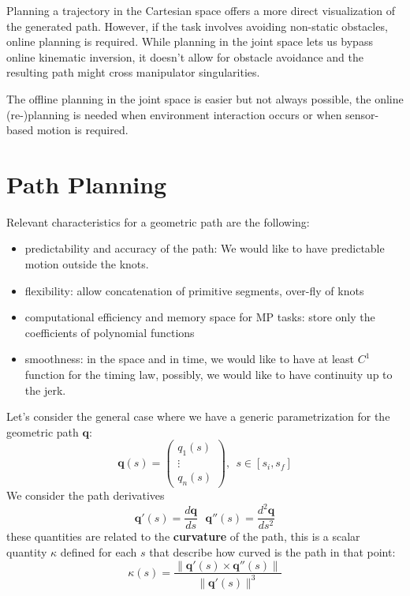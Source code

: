 \documentclass[10pt, letterpaper]{report}
\begin{document}
Planning a trajectory in the Cartesian space offers a more direct visualization of the generated path. However, if the task involves avoiding non-static obstacles, online planning is required. While planning in the joint space lets us bypass online kinematic inversion, it doesn't allow for obstacle avoidance and the resulting path might cross manipulator singularities.

The offline planning in the joint space is easier but not always possible, the online (re-)planning is needed when environment interaction
occurs or when sensor-based motion is required.
\section{Path Planning}
Relevant characteristics for a geometric path are the following:\begin{itemize}
    \item predictability and accuracy of the path: We would like to have predictable motion outside the knots.
    \item flexibility: allow concatenation of primitive segments, over-fly of knots
    \item computational efficiency and memory space for MP tasks: store only the coefficients of polynomial functions
    \item smoothness: in the space and in time, we would like to have at least $C^1$ function for the timing law, possibly, we would like to have continuity up to the jerk.
\end{itemize}
Let's consider the general case where we have a generic parametrization for the geometric path $\mathbf q$:\begin{equation}
    \mathbf q(s)=\begin{pmatrix}
        q_1(s)\\ \vdots \\ q_n(s)
    \end{pmatrix}, \ \ s\in [s_i,s_f]
\end{equation}
We consider the path derivatives\begin{equation}
    \mathbf q'(s)=\frac{d\mathbf q}{ds} \ \ \ \mathbf q''(s)=\frac{d^2\mathbf q}{ds^2}
\end{equation}
these quantities are related to the \textbf{curvature} of the path, this is a scalar quantity $\kappa$ defined for each $s$ that describe how curved is the path in that point:
\begin{equation}
    \kappa(s)=\frac{\| \mathbf q'(s)\times \mathbf q''(s) \|}{\|\mathbf q'(s)\|^3}
\end{equation}
\end{document}
